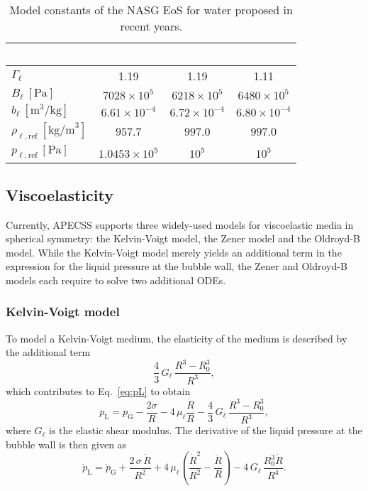 \begin{table*}
    \caption{Model constants of the NASG EoS for water proposed in recent years.}
    \label{tab:nasg}
    \begin{tabular}{lccc}
         & ~\citet{LeMetayer2016}~ & ~\citet{Chandran2019}~ & ~\citet{Denner2023}~\\
        \hline 
        $\Gamma_\ell$ & 1.19 & 1.19 & 1.11\\
        $B_\ell \ [\text{Pa}]$ & $7028 \times 10^5$ & $6218 \times 10^5$ & $6480 \times 10^5$ \\
        $b_\ell \ [\text{m}^3/\text{kg}]$ & $6.61 \times 10^{-4}$ & $6.72 \times 10^{-4}$ & $6.80 \times 10^{-4}$\\
        $\rho_{\ell,\text{ref}} \ [\text{kg/m}^3]$ & $957.7$ & $997.0$ & $997.0$ \\
        $p_{\ell,\text{ref}} \ [\text{Pa}]$ & $1.0453 \times 10^5$ & $10^5$ & $10^5$\\
        \hline
    \end{tabular}
\end{table*}

\subsection{Viscoelasticity}

Currently, APECSS supports three widely-used models for viscoelastic media in spherical symmetry: the Kelvin-Voigt model, the Zener model and the Oldroyd-B model. While the Kelvin-Voigt model merely yields an additional term in the expression for the liquid pressure at the bubble wall, the Zener and Oldroyd-B models each require to solve two additional ODEs.

\subsubsection{Kelvin-Voigt model}

To model a Kelvin-Voigt medium, the elasticity of the medium is described by the additional term 
\begin{equation}
    \frac{4}{3} \, G_\ell \, \frac{R^3-R_0^3}{R^3}, \label{eq:KVterm}
\end{equation}
which contributes to Eq.~\eqref{eq:pL} to obtain
\begin{equation}
    p_\text{L} = p_\text{G} - \frac{2 \sigma}{R} - 4 \, \mu_\ell \frac{\dot{R}}{R} - \frac{4}{3} \, G_\ell \, \frac{R^3-R_0^3}{R^3}, \label{eq:pL_KV}
\end{equation}
where $G_\ell$ is the elastic shear modulus. The derivative of the liquid pressure at the bubble wall is then given as
\begin{equation}
    \dot{p}_\mathrm{L} = \dot{p}_\mathrm{G} + \frac{2 \, \sigma \, \dot{R}}{R^2} + 4 \, \mu_\ell \left(\frac{\dot{R}^2}{R^2} - \frac{\ddot{R}}{R}\right) - 4 \, G_\ell \, \frac{R_0^3 \dot{R}}{R^4}.
    \label{eq:dotpL_KV}
\end{equation}

